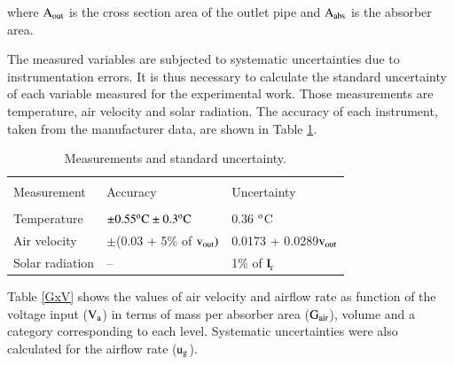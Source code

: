 \noindent where $\rm{A_{out}}$ is the cross section area of the outlet pipe and $\rm{A_{abs}}$ is the absorber area.

The measured variables are subjected to systematic uncertainties due to instrumentation errors. It is thus necessary to calculate the standard uncertainty of each variable measured for the experimental work. Those measurements are temperature, air velocity and solar radiation. The accuracy of each instrument, taken from the manufacturer data, are shown in Table \ref{uncertainty}.   

\begin{table}[!ht]
	\caption{Measurements and standard uncertainty.}
	\centering
	\begin{tabular}{p{3.0cm}p{3.5cm}p{3.5cm}}
		\hline \\[-10pt] 
		\rule[-1ex]{0pt}{2.5ex} Measurement & Accuracy & Uncertainty \\ [3pt]
		\hline \\[-10pt]
		\rule[-1ex]{0pt}{2.5ex} Temperature & ${\rm \pm0.55 ^{\rm o}C \pm0.3 ^{\rm o}C}$ & 0.36 $^{\rm o}$C \\ [5pt]
		\rule[-1ex]{0pt}{2.5ex} Air velocity &  $\pm$(0.03 + 5\% of ${\rm v_{out})}$ & 0.0173 + 0.0289${\rm v_{out}}$ \\ [5pt] 
		\rule[-1ex]{0pt}{2.5ex} Solar radiation & -- & 1\% of ${\rm I_{\!_T}}$ \\ [2pt]
		\hline 
	\end{tabular}
	\label{uncertainty}
	
\end{table}





Table \ref{GxV} shows the values of air velocity and airflow rate as function of the voltage input ($\rm{V_a}$) in terms of mass per absorber area ($\rm{G_{air}}$), volume and a category corresponding to each level. Systematic uncertainties were also calculated for the airflow rate (${\rm u_g}$).

